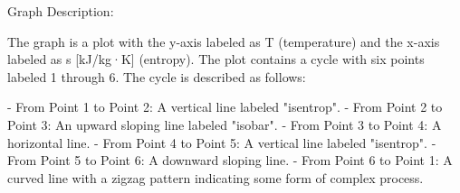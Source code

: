 Graph Description:

The graph is a plot with the y-axis labeled as T (temperature) and the x-axis labeled as s [kJ/kg·K] (entropy). The plot contains a cycle with six points labeled 1 through 6. The cycle is described as follows:

- From Point 1 to Point 2: A vertical line labeled "isentrop".
- From Point 2 to Point 3: An upward sloping line labeled "isobar".
- From Point 3 to Point 4: A horizontal line.
- From Point 4 to Point 5: A vertical line labeled "isentrop".
- From Point 5 to Point 6: A downward sloping line.
- From Point 6 to Point 1: A curved line with a zigzag pattern indicating some form of complex process.